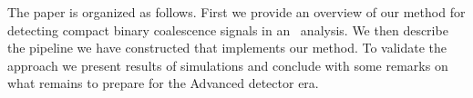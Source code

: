 The paper is organized as follows. First we provide an overview of our method
for detecting compact binary coalescence signals in an \earlywarning\ analysis.
We then describe the pipeline we have constructed that implements our method.
To validate the approach we present results of simulations and conclude with
some remarks on what remains to prepare for the Advanced detector era.

